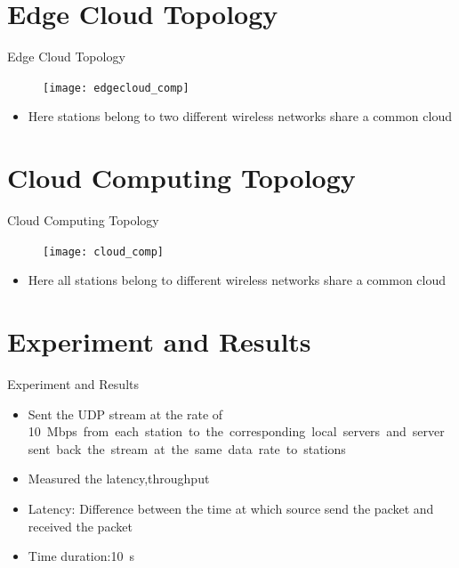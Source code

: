 \documentclass{beamer}
\begin{document}
\section{Edge Cloud Topology}

\begin{frame}{Edge Cloud Topology}
\begin{figure}
\texttt{[image: edgecloud\_comp]}
\centering
\end{figure}

\begin{itemize}
	\item Here stations belong to two different wireless networks share a common cloud
	
\end{itemize}
\end{frame}

\section{Cloud Computing Topology}

\begin{frame}{Cloud Computing Topology}
\begin{figure}
\texttt{[image: cloud\_comp]}
\centering
\end{figure}

\begin{itemize}
	\item Here all stations belong to different wireless networks share a common cloud

\end{itemize}
\end{frame}
\section{Experiment and Results}
\begin{frame}{Experiment and Results}

\begin{itemize}
	\item Sent the UDP stream at the rate of \SI{10}Mbps from each station to the corresponding local servers and server sent back the stream at the same data rate to stations
	\item Measured the latency,throughput
	\item Latency: Difference between the time at which source send the packet and received the packet
	\item Time duration:\SI{10}{\second}
\end{itemize}
\end{frame}
\end{document}
